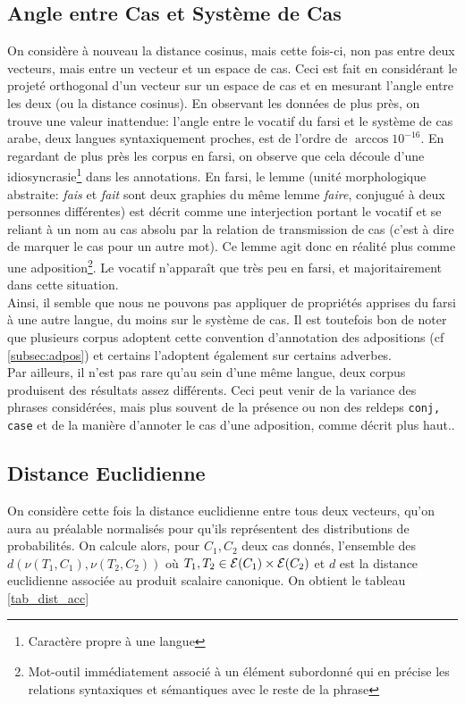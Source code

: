 \documentclass{cours}
\begin{document}
\subsection{Angle entre Cas et Système de Cas}\label{subsec:projection}
On considère à nouveau la distance cosinus, mais cette fois-ci, non pas entre deux vecteurs, mais entre un vecteur et un espace de cas.
Ceci est fait en considérant le projeté orthogonal d'un vecteur sur un espace de cas et en mesurant l'angle entre les deux (ou la distance cosinus).
En observant les données de plus près, on trouve une valeur inattendue: l'angle entre le vocatif du farsi et le système de cas arabe, deux langues syntaxiquement proches, est de l'ordre de $\arccos{10^{-16}}$.
En regardant de plus près les corpus en farsi, on observe que cela découle d'une idiosyncrasie\footnote{Caractère propre à une langue} dans les annotations.
En farsi, le lemme (unité morphologique abstraite: \textsl{fais} et \textsl{fait} sont deux graphies du même lemme \textsl{faire}, conjugué à deux personnes différentes)\label{farsi}
est décrit comme une interjection portant le vocatif et se reliant à un nom au cas absolu par la relation de transmission de cas (c'est à dire de marquer le cas pour un autre mot).
Ce lemme agit donc en réalité plus comme une adposition\footnote{Mot-outil immédiatement associé à un élément subordonné qui en précise les relations syntaxiques et sémantiques avec le reste de la phrase}.
Le vocatif n'apparaît que très peu en farsi, et majoritairement dans cette situation.\\
Ainsi, il semble que nous ne pouvons pas appliquer de propriétés apprises du farsi à une autre langue, du moins sur le système de cas.
Il est toutefois bon de noter que plusieurs corpus adoptent cette convention d'annotation des adpositions (cf \ref{subsec:adpos}) et certains l'adoptent également sur certains adverbes.\\
Par ailleurs, il n'est pas rare qu'au sein d'une même langue, deux corpus produisent des résultats assez différents. Ceci peut venir de la variance des phrases considérées, mais plus souvent de la présence ou non des reldeps \texttt{conj, case} et de la manière d'annoter le cas d'une adposition, comme décrit plus haut..

\subsection{Distance Euclidienne}\label{subsec:l2}
On considère cette fois la distance euclidienne entre tous deux vecteurs, qu'on aura au préalable normalisés pour qu'ils représentent des distributions de probabilités.
On calcule alors, pour $C_{1}, C_{2}$ deux cas donnés, l'ensemble des $d\left(\nu\left(T_{1}, C_{1}\right), \nu\left(T_{2}, C_{2}\right)\right)$ où $T_{1}, T_{2} \in \mathcal{E}(C_{1})\times \mathcal{E}(C_{2})$ et $d$ est la distance euclidienne associée au produit scalaire canonique.
On obtient le tableau \ref{tab_dist_acc}
\end{document}
